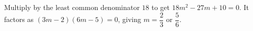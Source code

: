 Multiply by the least common denominator $18$ to get $18m^2-27m+10=0$. It factors as $(3m-2)(6m-5)=0$, giving $\boxed{m=\dfrac{2}{3}\text{ or }\dfrac{5}{6}}$.
